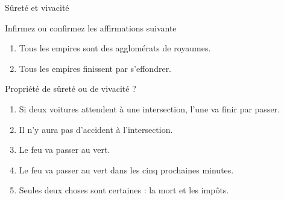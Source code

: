 
\begingroup

\begin{frame}{Sûreté et vivacité}
  \begin{alertblock}{Infirmez ou confirmez les affirmations suivante}
    \begin{enumerate}
    \item Tous les empires sont des agglomérats de royaumes.
    \item Tous les empires finissent par s'effondrer.
    \end{enumerate}
  \end{alertblock}
  \begin{alertblock}{Propriété de sûreté ou de vivacité ?}
    \begin{enumerate}
    \item Si deux voitures attendent à une intersection, l'une va finir par passer.
    \item Il n'y aura pas d'accident à l'intersection.
    \item Le feu va passer au vert.
    \item Le feu va passer au vert dans les cinq prochaines minutes.
    \item Seules deux choses sont certaines : la mort et les impôts.
    \end{enumerate}
  \end{alertblock}
\end{frame}

\endgroup
\endinput
